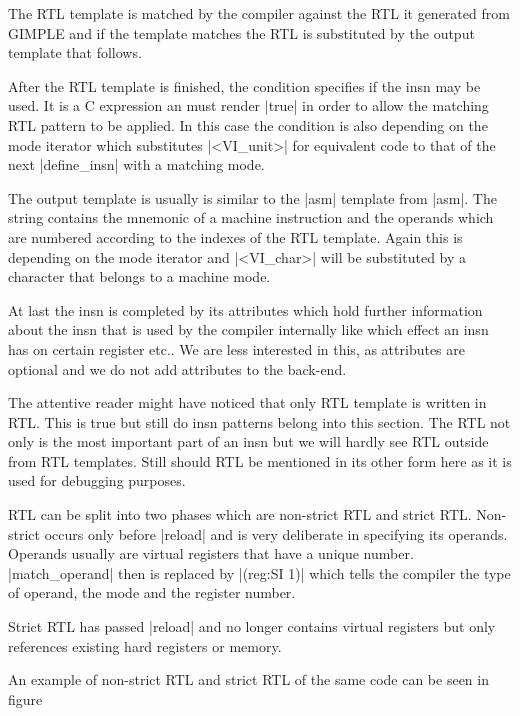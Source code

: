 The RTL template is matched by the compiler against the RTL it generated from GIMPLE and if the template matches the RTL is substituted by the output template that follows.

After the RTL template is finished, the condition specifies if the insn may be used.
It is a C expression an must render |true| in order to allow the matching RTL pattern to be applied.
In this case the condition is also depending on the mode iterator which substitutes |<VI_unit>| for equivalent code to that of the next |define_insn| with a matching mode. 

The output template is usually is similar to the |asm| template from |asm|.
The string contains the mnemonic of a machine instruction and the operands which are numbered according to the indexes of the RTL template.
Again this is depending on the mode iterator and |<VI_char>| will be substituted by a character that belongs to a machine mode. 

At last the insn is completed by its attributes which hold further information about the insn that is used by the compiler internally like which effect an insn has on certain register etc..
We are less interested in this, as attributes are optional and we do not add attributes to the back-end. 


The attentive reader might have noticed that only RTL template is written in RTL.
This is true but still do insn patterns belong into this section.
The RTL not only is the most important part of an insn but we will hardly see RTL outside from RTL templates.
Still should RTL be mentioned in its other form here as it is used for debugging purposes.

RTL can be split into two phases which are non-strict RTL and strict RTL.
Non-strict occurs only before |reload| and is very deliberate in specifying its operands.
Operands usually are virtual registers that have a unique number.
|match_operand| then is replaced by |(reg:SI 1)| which tells the compiler the type of operand, the mode and the register number.

Strict RTL has passed |reload| and no longer contains virtual registers but only references existing hard registers or memory.

An example of non-strict RTL and strict RTL of the same code can be seen in figure 

